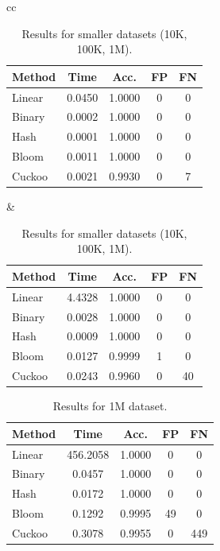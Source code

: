 \documentclass[acmsmall]{acmart}
\begin{document}
\begin{table}[h]
\centering
\caption{Results for smaller datasets (10K, 100K, 1M).}
\label{tab:results-small}
\begin{tabular}{cc}
\begin{minipage}{0.45\linewidth}
\centering
{}\label{tab:results-10k}
\begin{tabular}{lcccc}
\toprule
Method & Time & Acc. & FP & FN \\
\midrule
Linear & 0.0450 & 1.0000 & 0 & 0 \\
Binary & 0.0002 & 1.0000 & 0 & 0 \\
Hash   & 0.0001 & 1.0000 & 0 & 0 \\
Bloom  & 0.0011 & 1.0000 & 0 & 0 \\
Cuckoo & 0.0021 & 0.9930 & 0 & 7 \\
\bottomrule
\end{tabular}
\end{minipage}
&
\begin{minipage}{0.45\linewidth}
\centering
{}\label{tab:results-100k}
\begin{tabular}{lcccc}
\toprule
Method & Time & Acc. & FP & FN \\
\midrule
Linear & 4.4328 & 1.0000 & 0 & 0 \\
Binary & 0.0028 & 1.0000 & 0 & 0 \\
Hash   & 0.0009 & 1.0000 & 0 & 0 \\
Bloom  & 0.0127 & 0.9999 & 1 & 0 \\
Cuckoo & 0.0243 & 0.9960 & 0 & 40 \\
\bottomrule
\end{tabular}
\end{minipage}
\end{tabular}
\end{table}

\begin{table}[h]
\centering
\caption{Results for 1M dataset.}
\label{tab:results-1M}
\begin{tabular}{lcccc}
\toprule
Method & Time & Acc. & FP & FN \\
\midrule
Linear & 456.2058 & 1.0000 & 0 & 0 \\
Binary & 0.0457 & 1.0000 & 0 & 0 \\
Hash   & 0.0172 & 1.0000 & 0 & 0 \\
Bloom  & 0.1292 & 0.9995 & 49 & 0 \\
Cuckoo & 0.3078 & 0.9955 & 0 & 449 \\
\bottomrule
\end{tabular}
\end{table}
\end{document}
